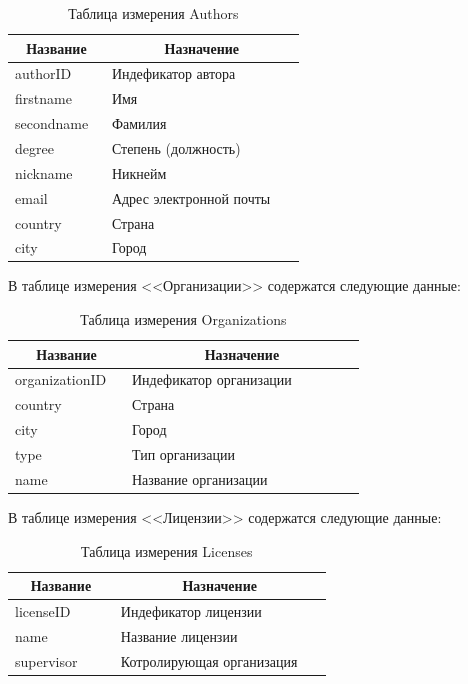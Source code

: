 \documentclass[a4paper,14pt]{extarticle}
\newcommand{\heading}[1]{\multicolumn{1}{|c|}{\textbf{#1}}}
\begin{document}
\begin{table}[h!]
	\caption{Таблица измерения Authors}
	\begin{tabular}{|p{0.3\linewidth}|p{0.6\linewidth}|}
		\hline
		\heading{Название} & \heading{Назначение} \\ \hline
		authorID & Индефикатор автора \\ \hline
		firstname & Имя \\ \hline
		secondname & Фамилия \\ \hline
		degree & Степень (должность) \\ \hline
		nickname & Никнейм \\ \hline
		email & Адрес электронной почты \\ \hline
		country & Страна \\ \hline
		city & Город \\ \hline
	\end{tabular}
	\label{tab:authors}
\end{table}

В таблице измерения <<Организации>> содержатся следующие данные:
\begin{table}[h!]
	\caption{Таблица измерения Organizations}
	\begin{tabular}{|p{0.3\linewidth}|p{0.6\linewidth}|}
		\hline
		\heading{Название} & \heading{Назначение} \\ \hline
		organizationID & Индефикатор организации \\ \hline
		country & Страна \\ \hline
		city & Город \\ \hline
		type & Тип организации \\ \hline
		name & Название организации \\ \hline
	\end{tabular}
	\label{tab:orgs}
\end{table}

\newpage
В таблице измерения <<Лицензии>> содержатся следующие данные:
\begin{table}[h!]
	\caption{Таблица измерения Licenses}
	\begin{tabular}{|p{0.3\linewidth}|p{0.6\linewidth}|}
		\hline
		\heading{Название} & \heading{Назначение} \\ \hline
		licenseID & Индефикатор лицензии \\ \hline
		name & Название лицензии \\ \hline
		supervisor & Котролирующая организация \\ \hline
	\end{tabular}
	\label{tab:licenses}
\end{table}
\end{document}
